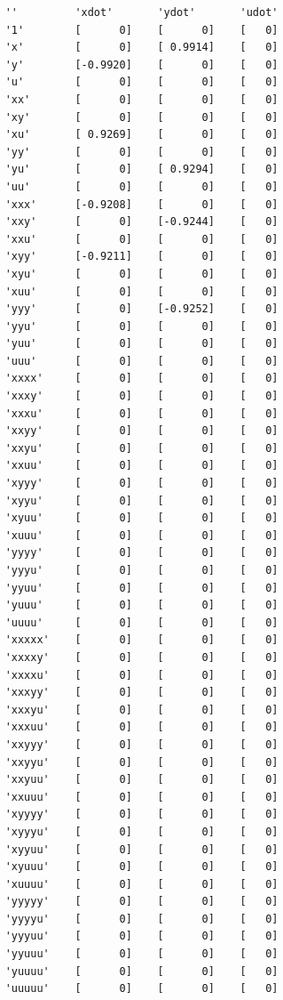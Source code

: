 \documentclass[onecolumn,11pt]{article}
\begin{document}
\begin{table}[where!]
\caption{\small Hopf normal form identified using sparse representation.  Here \texttt{u} represents the bifurcation parameter $\mu$.}\label{Tab:Hopf}
\begin{center}
\vspace{-.15in}
{\footnotesize
\begin{verbatim}
    ''         'xdot'       'ydot'       'udot'
    '1'        [      0]    [      0]    [   0]
    'x'        [      0]    [ 0.9914]    [   0]
    'y'        [-0.9920]    [      0]    [   0]
    'u'        [      0]    [      0]    [   0]
    'xx'       [      0]    [      0]    [   0]
    'xy'       [      0]    [      0]    [   0]
    'xu'       [ 0.9269]    [      0]    [   0]
    'yy'       [      0]    [      0]    [   0]
    'yu'       [      0]    [ 0.9294]    [   0]
    'uu'       [      0]    [      0]    [   0]
    'xxx'      [-0.9208]    [      0]    [   0]
    'xxy'      [      0]    [-0.9244]    [   0]
    'xxu'      [      0]    [      0]    [   0]
    'xyy'      [-0.9211]    [      0]    [   0]
    'xyu'      [      0]    [      0]    [   0]
    'xuu'      [      0]    [      0]    [   0]
    'yyy'      [      0]    [-0.9252]    [   0]
    'yyu'      [      0]    [      0]    [   0]
    'yuu'      [      0]    [      0]    [   0]
    'uuu'      [      0]    [      0]    [   0]
    'xxxx'     [      0]    [      0]    [   0]
    'xxxy'     [      0]    [      0]    [   0]
    'xxxu'     [      0]    [      0]    [   0]
    'xxyy'     [      0]    [      0]    [   0]
    'xxyu'     [      0]    [      0]    [   0]
    'xxuu'     [      0]    [      0]    [   0]
    'xyyy'     [      0]    [      0]    [   0]
    'xyyu'     [      0]    [      0]    [   0]
    'xyuu'     [      0]    [      0]    [   0]
    'xuuu'     [      0]    [      0]    [   0]
    'yyyy'     [      0]    [      0]    [   0]
    'yyyu'     [      0]    [      0]    [   0]
    'yyuu'     [      0]    [      0]    [   0]
    'yuuu'     [      0]    [      0]    [   0]
    'uuuu'     [      0]    [      0]    [   0]
    'xxxxx'    [      0]    [      0]    [   0]
    'xxxxy'    [      0]    [      0]    [   0]
    'xxxxu'    [      0]    [      0]    [   0]
    'xxxyy'    [      0]    [      0]    [   0]
    'xxxyu'    [      0]    [      0]    [   0]
    'xxxuu'    [      0]    [      0]    [   0]
    'xxyyy'    [      0]    [      0]    [   0]
    'xxyyu'    [      0]    [      0]    [   0]
    'xxyuu'    [      0]    [      0]    [   0]
    'xxuuu'    [      0]    [      0]    [   0]
    'xyyyy'    [      0]    [      0]    [   0]
    'xyyyu'    [      0]    [      0]    [   0]
    'xyyuu'    [      0]    [      0]    [   0]
    'xyuuu'    [      0]    [      0]    [   0]
    'xuuuu'    [      0]    [      0]    [   0]
    'yyyyy'    [      0]    [      0]    [   0]
    'yyyyu'    [      0]    [      0]    [   0]
    'yyyuu'    [      0]    [      0]    [   0]
    'yyuuu'    [      0]    [      0]    [   0]
    'yuuuu'    [      0]    [      0]    [   0]
    'uuuuu'    [      0]    [      0]    [   0]
\end{verbatim}
}
\end{center}
\end{table}
\end{document}
